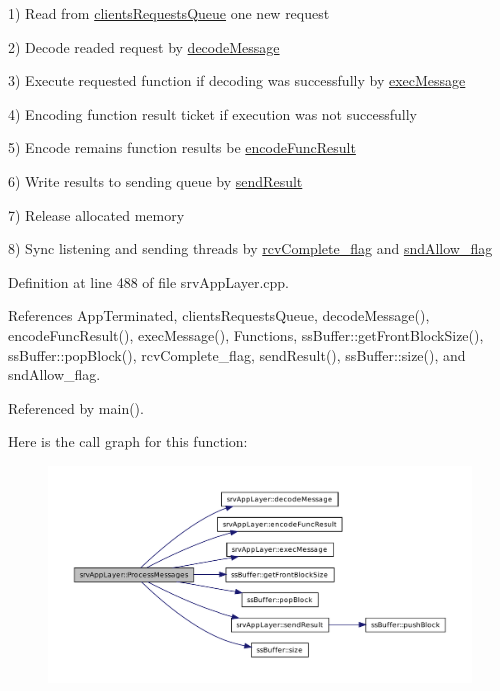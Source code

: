 1) Read from \hyperlink{classsrvAppLayer_a79e7499e8647eb0f0ba4fd9613fd48c0}{clientsRequestsQueue} one new request

2) Decode readed request by \hyperlink{classsrvAppLayer_a6d25c00bad6412988de50d868f7b6beb}{decodeMessage}

3) Execute requested function if decoding was successfully by \hyperlink{classsrvAppLayer_a905b6d497e0e06a59c172863057fded8}{execMessage}

4) Encoding function result ticket if execution was not successfully

5) Encode remains function results be \hyperlink{classsrvAppLayer_a8b24fc169b1da7445a6429abb66d84f9}{encodeFuncResult}

6) Write results to sending queue by \hyperlink{classsrvAppLayer_aed49ea99073088a26f98122a0e057c01}{sendResult}

7) Release allocated memory

8) Sync listening and sending threads by \hyperlink{srvAppLayer_8cpp_a868aa504f87bc9ec6698801f8af012de}{rcvComplete\_\-flag} and \hyperlink{srvAppLayer_8cpp_aada7bb79c19dd0f402f03860c1fd64f6}{sndAllow\_\-flag} 



Definition at line 488 of file srvAppLayer.cpp.



References AppTerminated, clientsRequestsQueue, decodeMessage(), encodeFuncResult(), execMessage(), Functions, ssBuffer::getFrontBlockSize(), ssBuffer::popBlock(), rcvComplete\_\-flag, sendResult(), ssBuffer::size(), and sndAllow\_\-flag.



Referenced by main().



Here is the call graph for this function:\nopagebreak
\begin{figure}[H]
\begin{center}
\leavevmode
\includegraphics[width=400pt]{d8/d72/classsrvAppLayer_a51173210a4569e0044efa91eb7089541_cgraph}
\end{center}
\end{figure}




